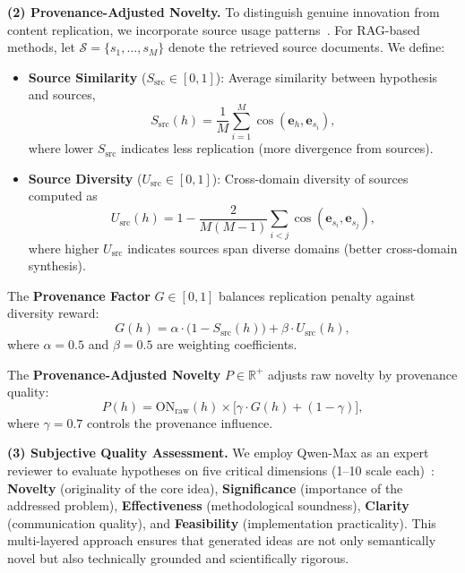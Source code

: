 \documentclass[runningheads]{llncs}
\begin{document}
\textbf{(2) Provenance-Adjusted Novelty.} To distinguish genuine innovation from content replication, we incorporate source usage patterns~\cite{lewis2020retrieval}. For RAG-based methods, let $\mathcal{S} = \{s_1, \ldots, s_M\}$ denote the retrieved source documents. We define:

\begin{itemize}[leftmargin=*, itemsep=2pt]
    \item \textbf{Source Similarity} ($S_{\text{src}} \in [0, 1]$): Average similarity between hypothesis and sources,
    \begin{equation}
        S_{\text{src}}(h) = \frac{1}{M} \sum_{i=1}^{M} \cos(\mathbf{e}_h, \mathbf{e}_{s_i}),
        \label{eq:s_src}
    \end{equation}
    where lower $S_{\text{src}}$ indicates less replication (more divergence from sources).
    
    \item \textbf{Source Diversity} ($U_{\text{src}} \in [0, 1]$): Cross-domain diversity of sources computed as~\cite{zeng2021fresh,shi2023surprising}
    \begin{equation}
        U_{\text{src}}(h) = 1 - \frac{2}{M(M-1)} \sum_{i<j} \cos(\mathbf{e}_{s_i}, \mathbf{e}_{s_j}),
        \label{eq:u_src}
    \end{equation}
    where higher $U_{\text{src}}$ indicates sources span diverse domains (better cross-domain synthesis).
\end{itemize}

The \textbf{Provenance Factor} $G \in [0, 1]$ balances replication penalty against diversity reward:
\begin{equation}
    G(h) = \alpha \cdot \big(1 - S_{\text{src}}(h)\big) + \beta \cdot U_{\text{src}}(h),
    \label{eq:provenance_factor}
\end{equation}
where $\alpha = 0.5$ and $\beta = 0.5$ are weighting coefficients.

The \textbf{Provenance-Adjusted Novelty} $P \in \mathbb{R}^+$ adjusts raw novelty by provenance quality:
\begin{equation}
   P(h) = \text{ON}_{\text{raw}}(h) \times \big[\gamma \cdot G(h) + (1 - \gamma)\big],
   \label{eq:p_score}
\end{equation}
where $\gamma = 0.7$ controls the provenance influence.

\textbf{(3) Subjective Quality Assessment.} We employ Qwen-Max as an expert reviewer to evaluate hypotheses on five critical dimensions (1--10 scale each)~\cite{gu2024llm,siyang2024novel}: \textbf{Novelty} (originality of the core idea), \textbf{Significance} (importance of the addressed problem), \textbf{Effectiveness} (methodological soundness), \textbf{Clarity} (communication quality), and \textbf{Feasibility} (implementation practicality). This multi-layered approach ensures that generated ideas are not only semantically novel but also technically grounded and scientifically rigorous.
\end{document}
